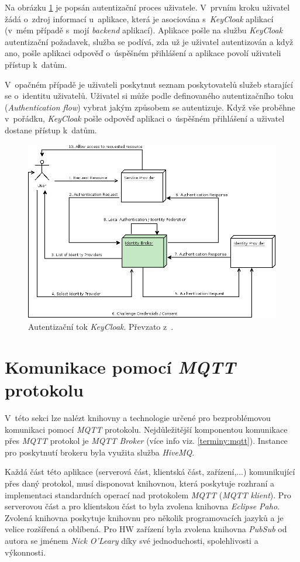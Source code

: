 Na obrázku \ref{figure:keycloak_flow} je popsán autentizační proces uživatele. V~prvním kroku uživatel žádá o~zdroj informací u~aplikace, která je asociována s~\emph{KeyCloak} aplikací (v~mém případě s~mojí \emph{backend} aplikací).
Aplikace pošle na službu \emph{KeyCloak} autentizační požadavek, služba se podívá, zda už je uživatel autentizován a když ano, pošle aplikaci odpověď o~úspěšném přihlášení a aplikace povolí uživateli přístup k~datům.

V~opačném případě je uživateli poskytnut seznam poskytovatelů služeb starající se o~identitu uživatelů.
Uživatel si může podle definovaného autentizačního toku (\emph{Authentication flow}) vybrat jakým způsobem se autentizuje.
Když vše proběhne v~pořádku, \emph{KeyCloak} pošle odpověď aplikaci o~úspěšném přihlášení a uživatel dostane přístup k~datům.~\cite{keycloak}

\begin{figure}[hbt]
  \centering
  \includegraphics[width=.8 \linewidth]{obrazky-figures/keycloak_flow.png}
  \caption{Autentizační tok \emph{KeyCloak}. Převzato z~\cite{keycloak}.}
  \label{figure:keycloak_flow}
\end{figure}

\section{Komunikace pomocí \emph{MQTT} protokolu}
\label{pouzite:mqtt}

V~této sekci lze nalézt knihovny a technologie určené pro bezproblémovou komunikaci pomocí \emph{MQTT} protokolu.
Nejdůležitější komponentou komunikace přes \emph{MQTT} protokol je \emph{MQTT Broker} (více info viz. \ref{terminy:mqtt}).
Instance pro poskytnutí brokeru byla využita služba \emph{HiveMQ}.

Každá část této aplikace (serverová část, klientská část, zařízení,...) komunikující přes daný protokol, musí disponovat knihovnou, která poskytuje rozhraní a implementaci standardních operací nad protokolem \emph{MQTT} (\emph{MQTT klient}).
Pro serverovou část a pro klientskou část to byla zvolena knihovna \emph{Eclipse Paho}.
Zvolená knihovna poskytuje knihovnu pro několik programovacích jazyků a je velice rozšířená a oblíbená.
Pro HW zařízení byla zvolena knihovna \emph{PubSub} od autora se jménem \emph{Nick O'Leary} díky své jednoduchosti, spolehlivosti a výkonnosti.

